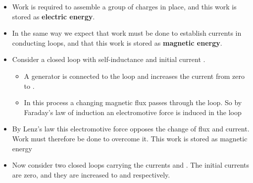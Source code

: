 \ELhold


\begin{ELunit}


\end{ELunit}

\ELhold


\begin{ELunit}

\begin{itemize}
\tightlist
\item
  Work is required to assemble a group of charges in place, and this work is stored as \textbf{electric energy}.
\item
  In the same way we expect that work must be done to establish currents in conducting loops, and that this work is stored as \textbf{magnetic energy}.
\item
  Consider a closed loop with self-inductance  and initial current .

  \begin{itemize}
  \tightlist
  \item
    A generator is connected to the loop and increases the current  from zero to .
  \item
    In this process a changing magnetic flux passes through the loop. So by Faraday's law of induction an electromotive force is induced in the loop
  \end{itemize}
\end{itemize}


\begin{itemize}
\tightlist
\item
  By Lenz's law this electromotive force opposes the change of flux and current. Work must therefore be done to overcome it. This work is stored as magnetic energy
\end{itemize}


\begin{itemize}
\tightlist
\item
  Now consider two closed loops carrying the currents  and . The initial currents are zero, and they are increased to  and  respectively.


\end{itemize}
\end{ELunit}
